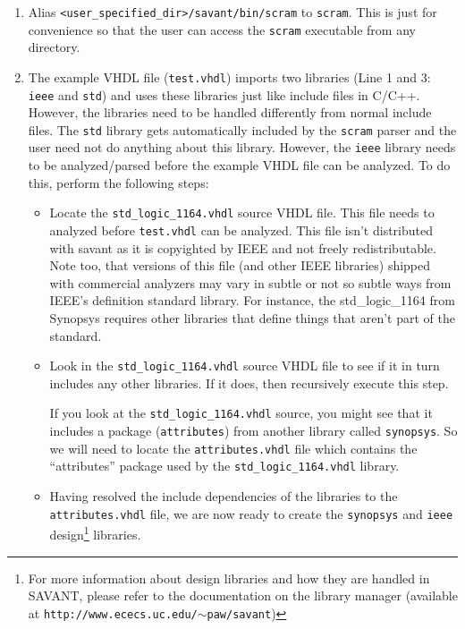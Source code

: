 \documentclass[12pt]{report}
\begin{document}
\begin{enumerate}

\item Alias \texttt{<user\_specified\_dir>/savant/bin/scram} to
      \texttt{scram}. This is just for convenience so that the user can
      access the \texttt{scram} executable from any directory.

\item The example VHDL file (\texttt{test.vhdl}) imports two libraries
      (Line 1 and 3: \texttt{ieee} and \texttt{std}) and uses these
      libraries just like include files in C/C++. However, the libraries
      need to be handled differently from normal include files. The
      \texttt{std} library gets automatically included by the
      \texttt{scram} parser and the user need not do anything about this
      library. However, the \texttt{ieee} library needs to be
      analyzed/parsed before the example VHDL file can be analyzed. To do
      this, perform the following steps:

      \begin{itemize}
	
	\item [Step 1:] Locate the \texttt{std\_logic\_1164.vhdl} source
	VHDL file. This file needs to analyzed before \texttt{test.vhdl}
	can be analyzed.  This file isn't distributed with savant as it is
	copyighted by IEEE and not freely redistributable.  Note too, that
	versions of this file (and other IEEE libraries) shipped with
	commercial analyzers may vary in subtle or not so subtle ways from
	IEEE's definition standard library.  For instance, the
	std\_logic\_1164 from Synopsys requires other libraries that define
	things that aren't part of the standard.

        \item [Step 2:] Look in the \texttt{std\_logic\_1164.vhdl} source
        VHDL file to see if it in turn includes any other libraries. If it
        does, then recursively execute this step. 

        If you look at the \texttt{std\_logic\_1164.vhdl} source, you might
        see that it includes a package (\texttt{attributes}) from another
        library called \texttt{synopsys}. So we will need to locate the
        \texttt{attributes.vhdl} file which contains the ``attributes''
        package used by the \texttt{std\_logic\_1164.vhdl} library.

	\item [Step 3:] Having resolved the include dependencies of the
	libraries to the \texttt{attributes.vhdl} file, we are now ready
	to create the \texttt{synopsys} and \texttt{ieee}
	design\footnote{For more information about design libraries and
	how they are handled in SAVANT, please refer to the documentation
	on the library manager (available at
	\texttt{http://www.ececs.uc.edu/$\sim$paw/savant})} libraries.


\end{itemize}
\end{enumerate}
\end{document}
